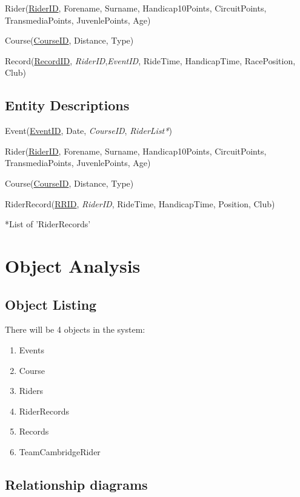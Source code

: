 Rider(\underline{RiderID}, Forename, Surname, Handicap10Points, CircuitPoints, TransmediaPoints, JuvenlePoints, Age)

Course(\underline{CourseID}, Distance, Type)

Record(\underline{RecordID}, \emph{RiderID},\emph{EventID}, RideTime, HandicapTime, RacePosition, Club)



\subsection{Entity Descriptions}
Event(\underline{EventID}, Date, \emph{CourseID}, \emph{RiderList*})

Rider(\underline{RiderID}, Forename, Surname, Handicap10Points, CircuitPoints, TransmediaPoints, JuvenlePoints, Age)

Course(\underline{CourseID}, Distance, Type)

RiderRecord(\underline{RRID}, \emph{RiderID}, RideTime, HandicapTime, Position, Club)

*List of 'RiderRecords'
\section{Object Analysis}

\subsection{Object Listing}
There will be 4 objects in the system:

\begin{enumerate}
    \item Events
    \item Course
    \item Riders

    \item RiderRecords

    \item Records
    \item TeamCambridgeRider

\end{enumerate}
\subsection{Relationship diagrams}

